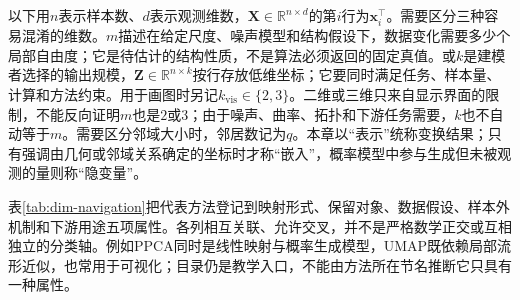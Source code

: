 以下用$n$表示样本数、$d$表示观测维数，$\bm{X}\in\mathbb{R}^{n\times d}$的第$i$行为$\bm{x}_i^{\top}$。需要区分三种容易混淆的维数。$m$描述在给定尺度、噪声模型和结构假设下，数据变化需要多少个局部自由度；它是待估计的结构性质，不是算法必须返回的固定真值。或$k$是建模者选择的输出规模，$\bm{Z}\in\mathbb{R}^{n\times k}$按行存放低维坐标；它要同时满足任务、样本量、计算和方法约束。用于画图时另记$k_{\mathrm{vis}}\in\{2,3\}$。二维或三维只来自显示界面的限制，不能反向证明$m$也是$2$或$3$；由于噪声、曲率、拓扑和下游任务需要，$k$也不自动等于$m$。需要区分邻域大小时，邻居数记为$q$。本章以“表示”统称变换结果；只有强调由几何或邻域关系确定的坐标时才称“嵌入”，概率模型中参与生成但未被观测的量则称“隐变量”。

表\ref{tab:dim-navigation}把代表方法登记到映射形式、保留对象、数据假设、样本外机制和下游用途五项属性。各列相互关联、允许交叉，并不是严格数学正交或互相独立的分类轴。例如PPCA同时是线性映射与概率生成模型，UMAP既依赖局部流形近似，也常用于可视化；目录仍是教学入口，不能由方法所在节名推断它只具有一种属性。

